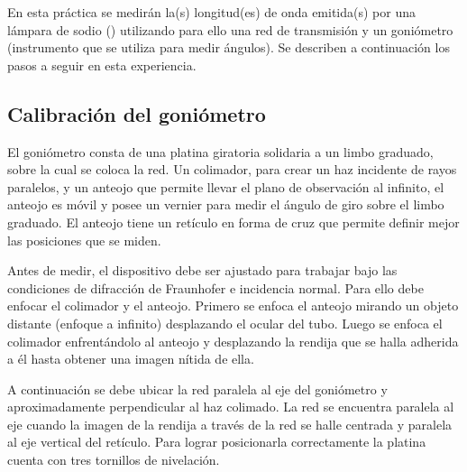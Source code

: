 \documentclass[laboratorio]{guia}
\begin{document}
En esta práctica se medirán la(s) longitud(es) de onda emitida(s) por una lámpara de sodio () utilizando para ello una red de transmisión y un goniómetro (instrumento que se utiliza para medir ángulos).
Se describen a continuación los pasos a seguir en esta experiencia.


\subsection{Calibración del goniómetro}
  El goniómetro consta de una platina giratoria solidaria a un limbo graduado, sobre la cual se coloca la red.
  Un colimador, para crear un haz incidente de rayos paralelos, y un anteojo que permite llevar el plano de observación al infinito, el anteojo es móvil y posee un vernier para medir el ángulo de giro sobre el limbo graduado.
  El anteojo tiene un retículo en forma de cruz que permite definir mejor las posiciones que se miden.

  Antes de medir, el dispositivo debe ser ajustado para trabajar bajo las condiciones de difracción de Fraunhofer e incidencia normal.
  Para ello debe enfocar el colimador y el anteojo.
Primero se enfoca el anteojo mirando un objeto distante (enfoque a infinito) desplazando el ocular del tubo.
  Luego se enfoca el colimador enfrentándolo al anteojo y desplazando la rendija que se halla adherida a él hasta obtener una imagen nítida de ella.

  A continuación se debe ubicar la red paralela al eje del goniómetro y aproximadamente perpendicular al haz colimado.
  La red se encuentra paralela al eje cuando la imagen de la rendija a través de la red se halle centrada y paralela al eje vertical del retículo.
  Para lograr posicionarla correctamente la platina cuenta con tres tornillos de nivelación.
\end{document}
